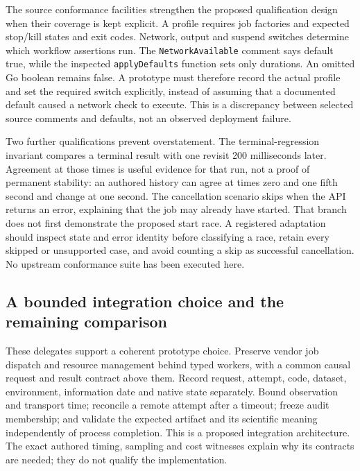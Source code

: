 The source conformance facilities strengthen the proposed qualification
design when their coverage is kept explicit. A profile requires job
factories and expected stop/kill states and exit codes. Network, output and
suspend switches determine which workflow assertions run. The
\texttt{NetworkAvailable} comment says default true, while the inspected
\texttt{applyDefaults} function sets only durations. An omitted Go boolean
remains false. A prototype must therefore record the actual profile and set
the required switch explicitly, instead of assuming that a documented
default caused a network check to execute. This is a discrepancy between
selected source comments and defaults, not an observed deployment failure.
\citep{exec23_workflow_delegates_positgo}

Two further qualifications prevent overstatement. The terminal-regression
invariant compares a terminal result with one revisit 200 milliseconds
later. Agreement at those times is useful evidence for that run, not a proof
of permanent stability: an authored history can agree at times zero and
one fifth second and change at one second. The cancellation scenario skips
when the API returns an error, explaining that the job may already have
started. That branch does not first demonstrate the proposed start race.
A registered adaptation should inspect state and error identity before
classifying a race, retain every skipped or unsupported case, and avoid
counting a skip as successful cancellation. No upstream conformance suite
has been executed here.
\citep{exec23_workflow_delegates_positgo,
exec23_workflow_delegates_reference}

\subsection{A bounded integration choice and the remaining comparison}

These delegates support a coherent prototype choice. Preserve vendor job
dispatch and resource management behind typed workers, with a common causal
request and result contract above them. Record request, attempt, code,
dataset, environment, information date and native state separately. Bound
observation and transport time; reconcile a remote attempt after a timeout;
freeze audit membership; and validate the expected artifact and its
scientific meaning independently of process completion. This is a proposed
integration architecture. The exact authored timing, sampling and cost
witnesses explain why its contracts are needed; they do not qualify the
implementation.

